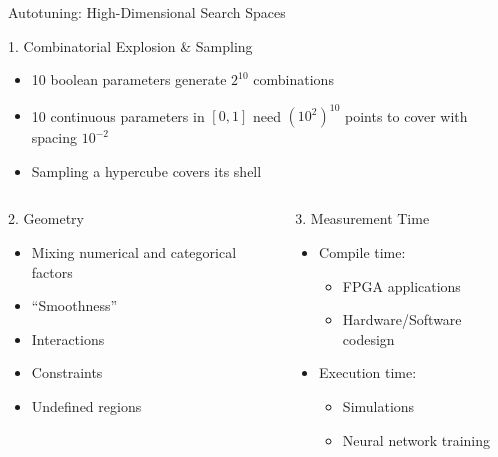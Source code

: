 \documentclass[10pt, compress, aspectratio=169, xcolor={table,usenames,dvipsnames}]{beamer}
\begin{document}
\begin{frame}[label={sec:orgbe519dc}]{Autotuning: High-Dimensional Search Spaces}
\begin{block}{1. \alert{Combinatorial Explosion \& Sampling}}
\begin{itemize}
\item 10 boolean parameters generate \(2^{10}\) combinations
\item 10 continuous parameters in \([0, 1]\)  need \((10^{2})^{10}\) points to cover with
spacing \(10^{-2}\)
\item Sampling a hypercube covers its shell
\end{itemize}
\end{block}

\begin{columns}
\begin{column}{0.5\columnwidth}
\begin{block}{2. \alert{Geometry}}
\begin{itemize}
\item Mixing numerical and categorical factors
\item ``Smoothness''
\item Interactions
\item Constraints
\item Undefined regions
\end{itemize}
\end{block}
\end{column}

\begin{column}{0.5\columnwidth}
\begin{block}{3. \alert{Measurement Time}}
\begin{itemize}
\item Compile time:
\begin{itemize}
\item FPGA applications
\item Hardware/Software codesign
\end{itemize}
\item Execution time:
\begin{itemize}
\item Simulations
\item Neural network training
\end{itemize}
\end{itemize}
\end{block}
\end{column}
\end{columns}
\end{frame}
\end{document}
